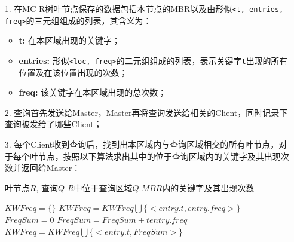 \documentclass{elegantpaper}
\begin{document}
\begin{itemize}
    
    \item[1.] 在MC-R树叶节点保存的数据包括本节点的MBR以及由形似\verb|<t, entries, freq>|的三元组组成的列表，其含义为：
              
              \begin{itemize}
                  
                \item {\bfseries t:} 在本区域出现的关键字；
                
                \item {\bfseries entries:} 形似\verb|<loc, freq>|的二元组组成的列表，表示关键字\verb|t|出现的所有位置及在该位置出现的次数；
                
                \item {\bfseries freq:} 该关键字在本区域出现的总次数；

              \end{itemize}

    \item[2.] 查询首先发送给Master，Master再将查询发送给相关的Client，同时记录下查询被发给了哪些Client；
    
    \item[3.] 每个Client收到查询后，找到出本区域内与查询区域相交的所有叶节点，对于每个叶节点，按照以下算法求出其中的位于查询区域内的关键字及其出现次数并返回给Master：
    
              \begin{algorithm}

                \begin{algorithmic}[1]

                    \Require 叶节点$R$, 查询$Q$
                    \Ensure $R$中位于查询区域$Q.MBR$内的关键字及其出现次数

                        \State $KWFreq = \{\}$
                                $KWFreq = KWFreq \bigcup \{<entry.t, entry.freq>\}$
                            \EndFor
                        \Else
                                \State $FreqSum = 0$
                                        \State $FreqSum = FreqSum + tentry.freq$
                                    \EndIf
                                \EndFor
                                    $KWFreq = KWFreq \bigcup \{<entry.t, FreqSum>\}$
                                \EndIf
                            \EndFor
                        \EndIf
                        \State {}
                    \EndFunction
                    

\end{algorithmic}
\end{algorithm}
\end{itemize}
\end{document}
